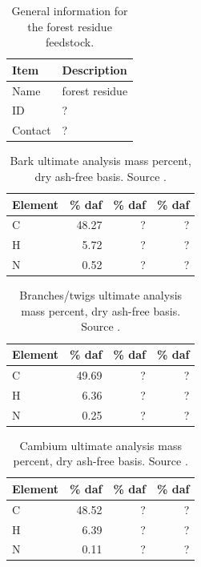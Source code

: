 \begin{table}[H]
    \centering
    \caption{General information for the forest residue feedstock.}
    \begin{tabular}{ll}
        \toprule
        Item    & Description \\
        \midrule
        Name    & forest residue \\
        ID      & ? \\
        Contact & ? \\
        \bottomrule
    \end{tabular}
\end{table}

\begin{table}[H]
    \centering
    \caption{Bark ultimate analysis mass percent, dry ash-free basis. Source \cite{Unknown-2019}.}
    \begin{tabular}{lrrr}
        \toprule
        Element & \% daf & \% daf & \% daf \\
        \midrule
        C        & 48.27 & ? & ? \\
        H        & 5.72  & ? & ? \\
        N        & 0.52  & ? & ? \\
        \bottomrule
    \end{tabular}
\end{table}

\begin{table}[H]
    \centering
    \caption{Branches/twigs ultimate analysis mass percent, dry ash-free basis. Source \cite{Unknown-2019}.}
    \begin{tabular}{lrrr}
        \toprule
        Element & \% daf & \% daf & \% daf \\
        \midrule
        C        & 49.69 & ? & ? \\
        H        & 6.36  & ? & ? \\
        N        & 0.25  & ? & ? \\
        \bottomrule
    \end{tabular}
\end{table}

\begin{table}[H]
    \centering
    \caption{Cambium ultimate analysis mass percent, dry ash-free basis. Source \cite{Unknown-2019}.}
    \begin{tabular}{lrrr}
        \toprule
        Element & \% daf & \% daf & \% daf \\
        \midrule
        C        & 48.52 & ? & ? \\
        H        & 6.39  & ? & ? \\
        N        & 0.11  & ? & ? \\
        \bottomrule
    \end{tabular}
\end{table}

